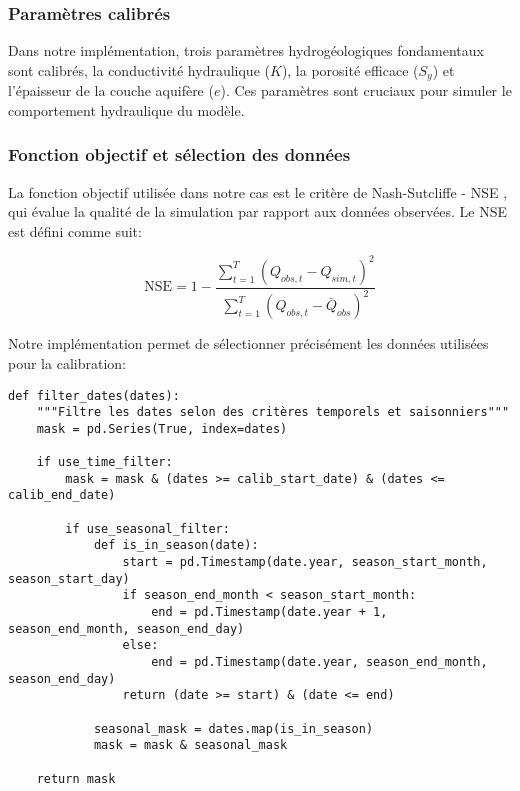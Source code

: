 \subsubsection{Paramètres calibrés}

Dans notre implémentation, trois paramètres hydrogéologiques fondamentaux sont calibrés, la conductivité hydraulique ($K$), la porosité efficace ($S_y$) et l'épaisseur de la couche aquifère ($e$). Ces paramètres sont cruciaux pour simuler le comportement hydraulique du modèle.

\subsubsection{Fonction objectif et sélection des données}

La fonction objectif utilisée dans notre cas est le critère de Nash-Sutcliffe - NSE \parencite{nashRiverFlowForecasting1970}, qui évalue la qualité de la simulation par rapport aux données observées. Le NSE est défini comme suit:

\begin{equation}\label{eq:nse}
    \text{NSE} = 1 - \frac{\sum_{t=1}^{T}(Q_{obs,t} - Q_{sim,t})^2}{\sum_{t=1}^{T}(Q_{obs,t} - \bar{Q}_{obs})^2}
\end{equation}

Notre implémentation permet de sélectionner précisément les données utilisées pour la calibration:

\begin{verbatim}
def filter_dates(dates):
    """Filtre les dates selon des critères temporels et saisonniers"""
    mask = pd.Series(True, index=dates)
    
    if use_time_filter:
        mask = mask & (dates >= calib_start_date) & (dates <= calib_end_date)
    
        if use_seasonal_filter:
            def is_in_season(date):
                start = pd.Timestamp(date.year, season_start_month, season_start_day)
                if season_end_month < season_start_month:
                    end = pd.Timestamp(date.year + 1, season_end_month, season_end_day)
                else:
                    end = pd.Timestamp(date.year, season_end_month, season_end_day)
                return (date >= start) & (date <= end)
            
            seasonal_mask = dates.map(is_in_season)
            mask = mask & seasonal_mask

    return mask
\end{verbatim}

